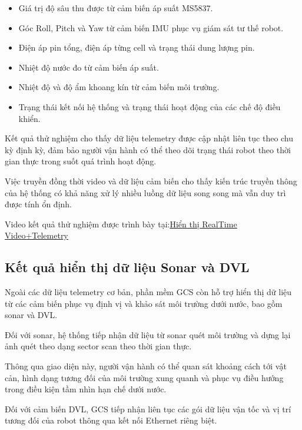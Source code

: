 \documentclass[../DoAn.tex]{subfiles}
\begin{document}
\begin{itemize}
    \item Giá trị độ sâu thu được từ cảm biến áp suất MS5837.
    
    \item Góc Roll, Pitch và Yaw từ cảm biến IMU phục vụ giám sát tư thế robot.
    
    \item Điện áp pin tổng, điện áp từng cell và trạng thái dung lượng pin.
    
    \item Nhiệt độ nước đo từ cảm biến áp suất.
    
    \item Nhiệt độ và độ ẩm khoang kín từ cảm biến môi trường.
    
    \item Trạng thái kết nối hệ thống và trạng thái hoạt động của các chế độ điều khiển.
\end{itemize}

Kết quả thử nghiệm cho thấy dữ liệu telemetry được cập nhật liên tục theo chu kỳ định kỳ, đảm bảo người vận hành có thể theo dõi trạng thái robot theo thời gian thực trong suốt quá trình hoạt động.

Việc truyền đồng thời video và dữ liệu cảm biến cho thấy kiến trúc truyền thông của hệ thống có khả năng xử lý nhiều luồng dữ liệu song song mà vẫn duy trì được tính ổn định.

Video kết quả thử nghiệm được trình bày tại:\href{https://drive.google.com/file/d/126JseNt3CxkLHu0OeOHQrsxOD38szYMj/view?usp=drive_link}{\underline{Hiển thị RealTime Video+Telemetry}}

\subsection{Kết quả hiển thị dữ liệu Sonar và DVL}

Ngoài các dữ liệu telemetry cơ bản, phần mềm GCS còn hỗ trợ hiển thị dữ liệu từ các cảm biến phục vụ định vị và khảo sát môi trường dưới nước, bao gồm sonar và DVL.

Đối với sonar, hệ thống tiếp nhận dữ liệu từ sonar quét môi trường và dựng lại ảnh quét theo dạng sector scan theo thời gian thực.

Thông qua giao diện này, người vận hành có thể quan sát khoảng cách tới vật cản, hình dạng tương đối của môi trường xung quanh và phục vụ điều hướng trong điều kiện tầm nhìn hạn chế dưới nước.

Đối với cảm biến DVL, GCS tiếp nhận liên tục các gói dữ liệu vận tốc và vị trí tương đối của robot thông qua kết nối Ethernet riêng biệt.
\end{document}
